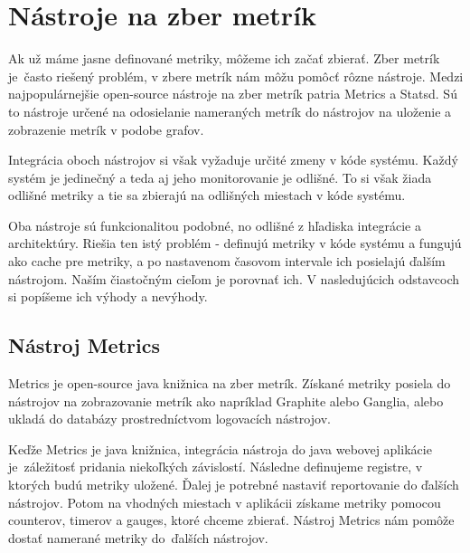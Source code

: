 \documentclass[a4paper, upjsfrontpage, disablespecwarning, thesismargins, thesislinespacing]{rnthesis}
\begin{document}
\chapter{Nástroje na zber metrík}

Ak už máme jasne definované metriky, môžeme ich začať zbierať.
Zber metrík je~často riešený problém, v zbere metrík nám môžu pomôcť rôzne nástroje.
Medzi naj\-populár\-nejšie open-source nástroje na zber metrík patria Metrics a Statsd.
Sú to nástroje určené na odosielanie nameraných metrík do nástrojov na uloženie a zobrazenie metrík v podobe grafov.

Integrácia oboch nástrojov si však vyžaduje určité zmeny v kóde systému.
Každý systém je jedinečný a teda aj jeho monitorovanie je odlišné.
To si však žiada odlišné metriky a tie sa zbierajú na odlišných miestach v kóde systému.

Oba nástroje sú funkcionalitou podobné, no odlišné z hľadiska integrácie a architektúry.
Riešia ten istý problém - definujú metriky v kóde systému a fungujú ako cache pre metriky, a po nastavenom časovom intervale ich posielajú ďalším nástrojom.
Naším čiastočným cieľom je porovnať ich.
V nasledujúcich odstavcoch si popíšeme ich výhody a nevýhody.


\section{Nástroj Metrics}

Metrics je open-source java knižnica na zber metrík.
Získané metriky posiela do nástrojov na zobrazovanie metrík ako napríklad Graphite alebo Ganglia, alebo ukladá do databázy prostredníctvom logovacích nástrojov.

Keďže Metrics je java knižnica, integrácia nástroja do java webovej aplikácie je~záležitosť pridania niekoľkých závislostí.
Následne definujeme registre, v ktorých budú metriky uložené.
Ďalej je potrebné nastaviť reportovanie do ďalších nástrojov.
Potom na vhodných miestach v aplikácii získame metriky pomocou counterov, timerov a gauges, ktoré chceme zbierať.
Nástroj Metrics nám pomôže dostať namerané metriky do~ďalších nástrojov.
\end{document}
